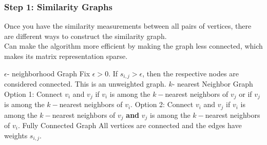 \documentclass{beamer}
\begin{document}
\begin{frame}
\frametitle{Step 1: Similarity Graphs}
Once you have the similarity measurements between all pairs of vertices, there are different ways to construct the similarity graph.
\\
\vspace{0.25 cm}
Can make the algorithm more efficient by making the graph less connected, which makes its matrix representation sparse.
\vspace{0.25 cm}
\begin{outline}
    \1 $\epsilon$- neighborhood Graph
        \2 Fix $\epsilon >0$. If  $s_{i,j} > \epsilon$, then the respective nodes are considered connected. This is an unweighted graph. 
    \1 $k$- nearest Neighbor Graph
        \2 Option 1: Connect $v_i$ and $v_j$ if $v_i$ is among the $k-$nearest neighbors of $v_j$ or if $v_j$ is among the $k-$nearest neighbors of $v_i$.
        \2 Option 2: Connect $v_i$ and $v_j$ if $v_i$ is among the $k-$nearest neighbors of $v_j$ \textbf{and}  $v_j$ is among the $k-$nearest neighbors of $v_i$.
    \1 Fully Connected Graph
        \2 All vertices are connected and the edges have weights $s_{i,j}$. 
\end{outline}
\end{frame}
\end{document}
